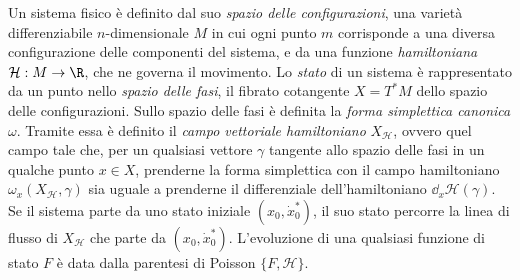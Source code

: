 Un sistema fisico è definito dal suo \emph{spazio delle configurazioni}, una varietà differenziabile $n$-dimensionale $M$ in cui ogni punto $m$ corrisponde a una diversa configurazione delle componenti del sistema, e da una funzione \emph{hamiltoniana} $\mathcal{H}: M\to \R$, che ne governa il movimento. Lo \emph{stato} di un sistema è rappresentato da un punto nello \emph{spazio delle fasi}, il fibrato cotangente $X = T^* M$ dello spazio delle configurazioni. Sullo spazio delle fasi è definita la \emph{forma simplettica canonica} $\omega$. Tramite essa è definito il \emph{campo vettoriale hamiltoniano} $X_{\mathcal{H}}$, ovvero quel campo tale che, per un qualsiasi vettore $\gamma$ tangente allo spazio delle fasi in un qualche punto $x \in X$, prenderne la forma simplettica con il campo hamiltoniano $\omega_{x}(X_{\mathcal{H}}, \gamma)$ sia uguale a prenderne il differenziale dell'hamiltoniano $\dd_{x}{\mathcal{H}}(\gamma)$. Se il sistema parte da uno stato iniziale $(x_0, \dot{x}^*_0)$, il suo stato percorre la linea di flusso di $X_{\mathcal{H}}$ che parte da $(x_0, \dot{x}^*_0)$. L'evoluzione di una qualsiasi funzione di stato $F$ è data dalla parentesi di Poisson $\{F, \mathcal{H}\}$.